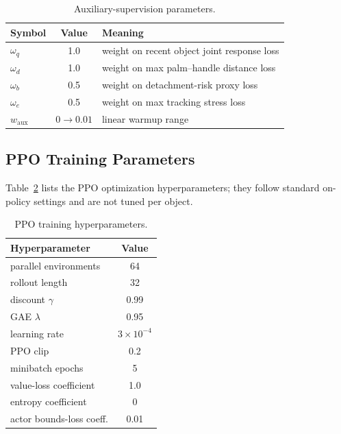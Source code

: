 \documentclass{llmxive}
\begin{document}
\begin{table}[ht]
\centering
\small
\begin{tabular}{lcl}
\toprule
Symbol & Value & Meaning \\
\midrule
$\omega_q$         & 1.0 & weight on recent object joint response loss \\
$\omega_d$         & 1.0 & weight on max palm--handle distance loss \\
$\omega_b$         & 0.5 & weight on detachment-risk proxy loss \\
$\omega_e$         & 0.5 & weight on max tracking stress loss \\
$w_{\mathrm{aux}}$ & $0\rightarrow 0.01$ & linear warmup range \\
\bottomrule
\end{tabular}
\caption{Auxiliary-supervision parameters.}
\label{tab:auxhp}
\end{table}


\subsection{PPO Training Parameters}
\label{app:ppohp}

Table~\ref{tab:ppohp} lists the PPO optimization hyperparameters; they
follow standard on-policy settings and are not tuned per object.

\begin{table}[ht]
\centering
\small
\begin{tabular}{lc}
\toprule
Hyperparameter & Value \\
\midrule
parallel environments     & 64 \\
rollout length            & 32 \\
discount $\gamma$         & 0.99 \\
GAE $\lambda$             & 0.95 \\
learning rate             & $3\times 10^{-4}$ \\
PPO clip                  & 0.2 \\
minibatch epochs          & 5 \\
value-loss coefficient    & 1.0 \\
entropy coefficient       & 0 \\
actor bounds-loss coeff.  & 0.01 \\
\bottomrule
\end{tabular}
\caption{PPO training hyperparameters.}
\label{tab:ppohp}
\end{table}
\end{document}
